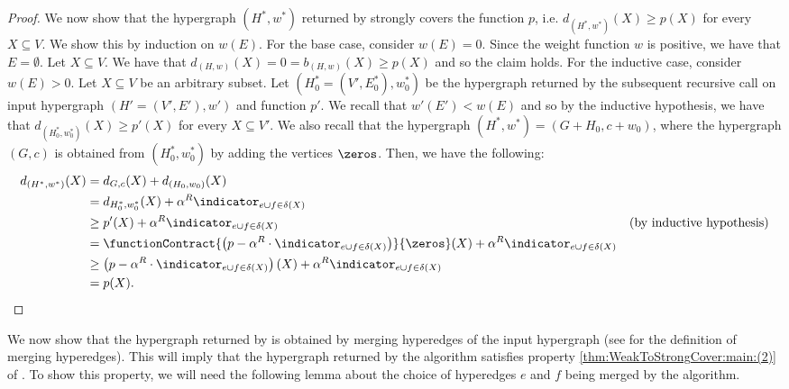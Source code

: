 \begin{proof}
We now show that the hypergraph $(H^*,w^*)$ returned by  strongly covers the function $p$, i.e. $d_{(H^*, w^*)}(X) \geq p(X)$ for every $X\subseteq V$. We show this by induction on $w(E)$. For the base case, consider $w(E) = 0$. Since the weight function $w$ is positive, we have that $E = \emptyset$.
Let $X \subseteq V$. We have that $d_{(H, w)}(X) = 0 = b_{(H,w)}(X) \geq p(X)$ and so the claim holds. For the inductive case, consider $w(E) > 0$. Let $X\subseteq V$ be an arbitrary subset. 
Let $(H_0^* = (V', E_0^*), w_0^*)$ be the hypergraph returned by the subsequent recursive call on input hypergraph $(H' = (V', E'), w')$ and function $p'$. 
We recall that $w'(E') < w(E)$ and so by the inductive hypothesis, we have that $d_{(H_0^*, w_0^*)}(X) \geq p'(X)$ for every $X\subseteq V'$. We also recall that the hypergraph $(H^*, w^*) = (G+H_0, c + w_0)$, where the hypergraph $(G, c)$ is obtained from $(H_0^*, w_0^*)$ by adding the vertices $\zeros$. Then, we have the following:
\begin{align*}
    d_{(H^*, w^*)}(X)& = d_{G,c}(X) + d_{(H_0, w_0)}(X)&\\
    & = d_{H_0^*, w_0^*}(X) + \alpha^R\indicator_{e\cup f\in \delta(X)}&\\
    &\geq p'(X) + \alpha^R\indicator_{e\cup f\in \delta(X)}& \text{(by inductive hypothesis)}\\
    & = \functionContract{\left(p - \alpha^R\cdot \indicator_{e\cup f\in \delta(X)}\right)}{\zeros}(X) + \alpha^R\indicator_{e\cup f\in \delta(X)} &\\
    &\geq \left(p - \alpha^R\cdot  \indicator_{e\cup f\in \delta(X)}\right)(X) + \alpha^R\indicator_{e\cup f\in \delta(X)}&\\
    &= p(X).&
\end{align*}
\end{proof}

We now show that the hypergraph returned by  is obtained by merging hyperedges of the input hypergraph (see  for the definition of merging hyperedges). 
This will imply that the hypergraph returned by the algorithm satisfies property \ref{thm:WeakToStrongCover:main:(2)} of . To show this property, we will need the following lemma about the choice of hyperedges $e$ and $f$ being merged by the algorithm.

